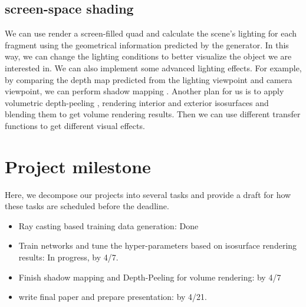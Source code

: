 \documentclass[journal]{vgtc}                %
\begin{document}
\subsection{screen-space shading}
We can use render a screen-filled quad and calculate the scene's lighting for each fragment using the geometrical information predicted by the generator. In this way, we can change the lighting conditions to better visualize the object we are interested in. We can also implement some advanced lighting effects. For example, by comparing the depth map predicted from the lighting viewpoint and camera viewpoint, we can perform shadow mapping \cite{williams1978casting}. Another plan for us is to apply volumetric depth-peeling \cite{zolt2003depthpeel},  rendering interior and exterior isosurfaces and blending them to get volume rendering results. Then we can use different transfer functions to get different visual effects.  


\section{Project milestone}

Here, we decompose our projects into several tasks and provide a draft for how these tasks are scheduled before the deadline.

\begin{itemize}
\item Ray casting based training data generation: Done
\item Train networks and tune the hyper-parameters based on isosurface rendering results: In progress, by 4/7.
\item Finish shadow mapping and Depth-Peeling for volume rendering: by 4/7
\item write final paper and prepare presentation: by 4/21. 

\end{itemize}

%

%
%
%


\end{document}
